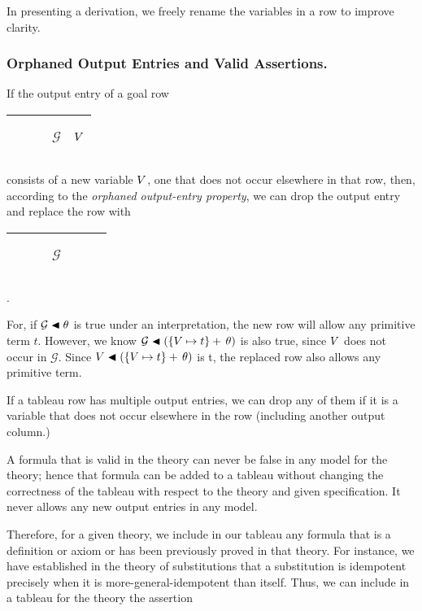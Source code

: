\documentclass[runningheads]{llncs}
\begin{document}
In presenting a derivation, we freely rename the variables in a row to improve clarity.

\subsubsection{Orphaned Output Entries and Valid Assertions.} If the output entry of a goal row 
   \begin{center}
\begin{tabular} {T}
\hline
    $\qquad$ &  \begin{center}$ \mathcal{G}$\end{center} &  \begin{center}$V$\end{center} \\
 \hline
\end{tabular}
\end{center}
consists of a  new variable $V$, one that does not occur elsewhere in that row, then, according to the \emph{orphaned output-entry property}, we can drop the output entry and replace the row with
   \begin{center}
\begin{tabular} {T}
\hline
    $\qquad$ &  \begin{center}$ \mathcal{G}$\end{center} & $\qquad$\\
 \hline
\end{tabular}.
\end{center}
For, if $\mathcal{G}\blacktriangleleft \theta$ is true under an interpretation, the new row will allow any primitive term $t.$ However, we know $\mathcal{G}\blacktriangleleft 
 (\{V \mapsto t\} + \, \theta) $ is also true, since $V$ does not occur in $\mathcal{G}.$ Since $V\blacktriangleleft (\{V \mapsto t\} + \, \theta)$ is {t}, the replaced row also allows any primitive term.

 If a tableau row has multiple output entries, we can drop any of them if it is a variable that does not occur elsewhere in the row (including another output column.)

A formula that is valid in the theory can never be false in any model for the theory; hence that formula can be added to a tableau without changing the correctness of the tableau with respect to the theory and given specification. It never allows any new output entries in any model. 

Therefore, for a given theory,  we include in our tableau any formula that is a definition or axiom or has been previously proved in that theory. For instance, we have established in the theory of substitutions that a substitution is idempotent precisely when it is more-general-idempotent than itself.  Thus, we can include in a tableau for the theory the assertion
\end{document}
